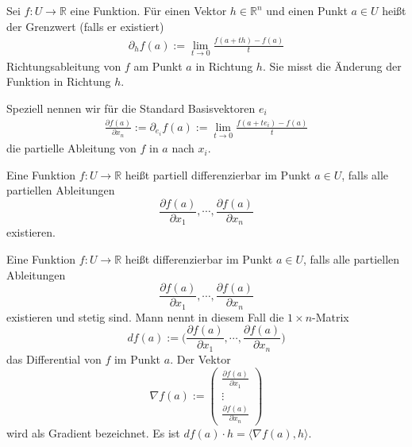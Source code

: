 \begin{Definition}[Richtungsableitung]
Sei $f: U \to \mathbb{R}$ eine Funktion. Für einen Vektor $h \in  \mathbb{R}^n$  und einen Punkt  $a \in U$ heißt der Grenzwert (falls er existiert) 
\begin{align*}
\partial_h f(a) := \lim_{t \to 0} \frac{f(a + th) - f(a)}{t}
\end{align*}
Richtungsableitung von $f$ am Punkt $a$ in Richtung $h$. Sie misst die Änderung der Funktion in Richtung $h$.

Speziell nennen wir für die Standard Basisvektoren $e_i$ 
\begin{align*}
\frac{\partial f(a)}{\partial x_n}  := \partial_{e_i} f(a) := \lim_{t \to 0} \frac{f(a + t e_i) - f(a)}{t}
\end{align*}
die partielle Ableitung von $f$ in $a$ nach $x_i$.
\end{Definition}

\begin{Definition}
Eine Funktion  $f: U \to \mathbb{R}$ heißt partiell differenzierbar im Punkt $a \in U$, falls alle partiellen Ableitungen 
$$\frac{\partial f(a)}{\partial x_1}, \cdots , \frac{\partial f(a)}{\partial x_n}$$ 
existieren.
\end{Definition}

\begin{Definition}[Differenzierbarkeit]
\label{diffbarkeit}
Eine Funktion $f: U \to \mathbb{R}$ heißt  differenzierbar im Punkt $a \in U$, falls alle partiellen Ableitungen 
$$\frac{\partial f(a)}{\partial x_1}, \cdots, \frac{\partial f(a)}{\partial x_n}$$
 existieren und stetig sind.  Mann nennt  in diesem Fall die $1 \times n$-Matrix 
$$df(a) := \biggl( \frac{\partial f(a)}{\partial x_1}, \cdots, \frac{\partial f(a)}{\partial x_n} \biggr)$$
das Differential von $f$ im Punkt $a$. Der Vektor 
$$\nabla f (a) := \begin{pmatrix}  \frac{\partial f(a)}{\partial x_1} \\  \vdots \\ \frac{\partial f(a)}{\partial x_n}  \end{pmatrix}$$
wird als Gradient bezeichnet. Es ist $df(a) \cdot h = \langle \nabla f (a) , h \rangle$.
\end{Definition}


